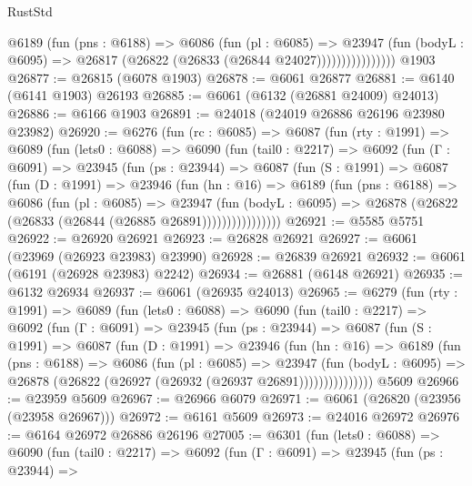 \begin{lexlean}{RustStd}
\begin{coremodule}
{\begin{coremodule}
{{{{{{{{{{{{{{{{{{{{{{{{{{                      @6189
                        (fun (pns : @6188) =>
                        @6086
                          (fun (pl : @6085) =>
                          @23947
                            (fun (bodyL : @6095) =>
                            @26817 (@26822 (@26833 (@26844 @24027))))))))))))))))
    @1903
@26877 := @26815 (@6078 @1903)
@26878 := @6061 @26877
@26881 := @6140 (@6141 @1903) @26193
@26885 := @6061 (@6132 (@26881 @24009) @24013)
@26886 := @6166 @1903
@26891 := @24018 (@24019 @26886 @26196 @23980 @23982)
@26920 := @6276
    (fun (rc : @6085) =>
    @6087
      (fun (rty : @1991) =>
      @6089
        (fun (lets0 : @6088) =>
        @6090
          (fun (tail0 : @2217) =>
          @6092
            (fun (Γ : @6091) =>
            @23945
              (fun (ps : @23944) =>
              @6087
                (fun (S : @1991) =>
                @6087
                  (fun (D : @1991) =>
                  @23946
                    (fun (hn : @16) =>
                    @6189
                      (fun (pns : @6188) =>
                      @6086
                        (fun (pl : @6085) =>
                        @23947
                          (fun (bodyL : @6095) =>
                          @26878 (@26822 (@26833 (@26844 (@26885 @26891))))))))))))))))
@26921 := @5585 @5751
@26922 := @26920 @26921
@26923 := @26828 @26921
@26927 := @6061 (@23969 (@26923 @23983) @23990)
@26928 := @26839 @26921
@26932 := @6061 (@6191 (@26928 @23983) @2242)
@26934 := @26881 (@6148 @26921)
@26935 := @6132 @26934
@26937 := @6061 (@26935 @24013)
@26965 := @6279
    (fun (rty : @1991) =>
    @6089
      (fun (lets0 : @6088) =>
      @6090
        (fun (tail0 : @2217) =>
        @6092
          (fun (Γ : @6091) =>
          @23945
            (fun (ps : @23944) =>
            @6087
              (fun (S : @1991) =>
              @6087
                (fun (D : @1991) =>
                @23946
                  (fun (hn : @16) =>
                  @6189
                    (fun (pns : @6188) =>
                    @6086
                      (fun (pl : @6085) =>
                      @23947
                        (fun (bodyL : @6095) =>
                        @26878 (@26822 (@26927 (@26932 (@26937 @26891)))))))))))))))
    @5609
@26966 := @23959 @5609
@26967 := @26966 @6079
@26971 := @6061 (@26820 (@23956 (@23958 @26967)))
@26972 := @6161 @5609
@26973 := @24016 @26972
@26976 := @6164 @26972 @26886 @26196
@27005 := @6301
    (fun (lets0 : @6088) =>
    @6090
      (fun (tail0 : @2217) =>
      @6092
        (fun (Γ : @6091) =>
        @23945
          (fun (ps : @23944) =>
}}}}}}}}}}}}}}}}}}}}}}}}}}
\end{coremodule}}
\end{coremodule}
\end{lexlean}
